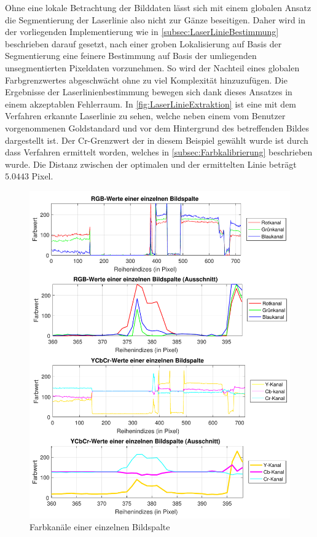 \bigbreak
Ohne eine lokale Betrachtung der Bilddaten lässt sich mit einem globalen Ansatz die Segmentierung der Laserlinie also nicht zur  Gänze beseitigen. Daher wird in der vorliegenden Implementierung wie in \ref{subsec:LaserLinieBestimmung} beschrieben darauf gesetzt, nach einer groben Lokalisierung auf Basis der Segmentierung eine feinere Bestimmung auf Basis der umliegenden unsegmentierten Pixeldaten vorzunehmen. So wird der Nachteil eines globalen Farbgrenzwertes abgeschwächt ohne zu viel Komplexität hinzuzufügen. Die Ergebnisse der Laserlinienbestimmung bewegen sich dank dieses Ansatzes in einem akzeptablen Fehlerraum. In \ref{fig:LaserLinieExtraktion} ist eine mit dem Verfahren erkannte Laserlinie zu sehen, welche neben einem vom Benutzer vorgenommenen Goldstandard und vor dem Hintergrund des betreffenden Bildes dargestellt ist. Der Cr-Grenzwert der in diesem Beispiel gewählt wurde ist durch dass Verfahren ermittelt worden, welches in \ref{subsec:Farbkalibrierung} beschrieben wurde. Die Distanz zwischen der optimalen und der ermittelten Linie beträgt \(5.0443\) Pixel.

\begin{figure}
\centering \includegraphics[width=\textwidth]{images/Colour.pdf}
\caption[Farbkanäle einer einzelnen Bildspalte]{Farbkanäle einer einzelnen Bildspalte}\label{fig:farbwerte}
\end{figure}

